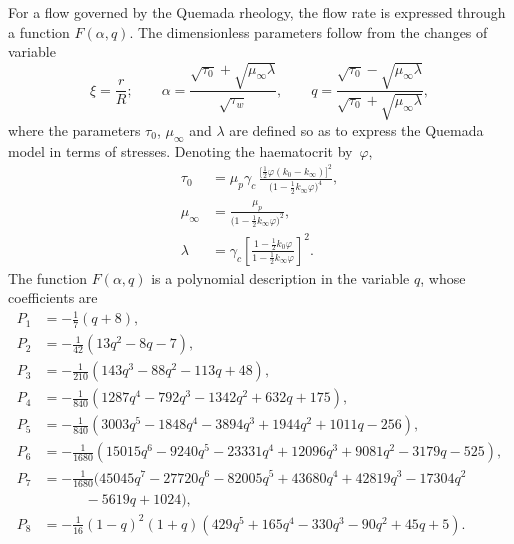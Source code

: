 \documentclass[lineno]{jfm}
\begin{document}
For a flow governed by the Quemada rheology, the flow rate is expressed through a
function $F(\alpha,q)$. The dimensionless parameters follow from the changes of
variable
\begin{equation}
\xi = \frac{r}{R};\qquad
\alpha = \frac{\sqrt{\tau_0} + \sqrt{\mu_\infty \lambda}}{\sqrt{\tau_w}}, \qquad
q = \frac{\sqrt{\tau_0} - \sqrt{\mu_\infty \lambda}}{\sqrt{\tau_0} + \sqrt{\mu_\infty \lambda}},
\end{equation}
where the parameters $\tau_0$, $\mu_\infty$ and $\lambda$ are defined so as to
express the Quemada model in terms of stresses. Denoting the haematocrit
by~$\varphi$,
\begin{align}
\tau_0 &= \mu_p \gamma_c\,
  \frac{\bigl[\tfrac{1}{2}\varphi(k_0 - k_\infty)\bigr]^2}
       {\bigl(1 - \tfrac{1}{2} k_\infty \varphi\bigr)^4},\\[4pt]
\mu_\infty &= \frac{\mu_p}{\bigl(1 - \tfrac{1}{2} k_\infty \varphi\bigr)^2},\\[4pt]
\lambda &= \gamma_c
  \left[\frac{1 - \tfrac{1}{2} k_0 \varphi}{1 - \tfrac{1}{2} k_\infty \varphi}\right]^2 .
\end{align}
The function $F(\alpha,q)$ is a polynomial description in the variable $q$, whose
coefficients are
\begin{align}
P_1 &= -\tfrac{1}{7}(q+8), \\
P_2 &= -\tfrac{1}{42}(13q^2 - 8q - 7), \\
P_3 &= -\tfrac{1}{210}(143q^3 - 88q^2 - 113q + 48), \\
P_4 &= -\tfrac{1}{840}(1287q^4 - 792q^3 - 1342q^2 + 632q + 175), \\
P_5 &= -\tfrac{1}{840}(3003q^5 - 1848q^4 - 3894q^3 + 1944q^2 + 1011q - 256), \\
P_6 &= -\tfrac{1}{1680}(15015q^6 - 9240q^5 - 23331q^4 + 12096q^3 + 9081q^2
       - 3179q - 525), \\
P_7 &= -\tfrac{1}{1680}(45045q^7 - 27720q^6 - 82005q^5 + 43680q^4 + 42819q^3
       - 17304q^2 \nonumber\\
    &\qquad\quad - 5619q + 1024), \\
P_8 &= -\tfrac{1}{16}(1-q)^2(1+q)(429q^5 + 165q^4 - 330q^3 - 90q^2 + 45q + 5).
\end{align}
\section{}\label{appC}




\end{document}
